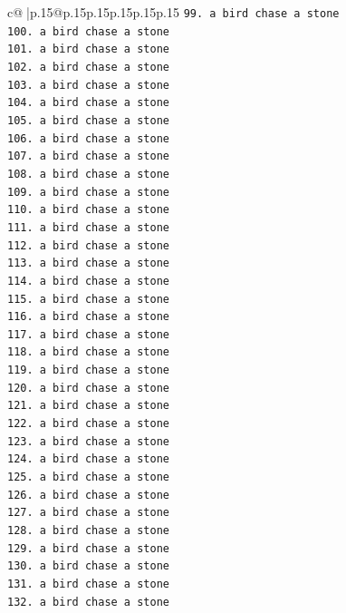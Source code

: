 \documentclass{article}
\begin{document}
{\begin{supertabular}{c@{$\;$}|p{.15\linewidth}@{}p{.15\linewidth}p{.15\linewidth}p{.15\linewidth}p{.15\linewidth}p{.15\linewidth}}
{{{\texttt{99. a bird chase a stone} \\
\texttt{100. a bird chase a stone} \\
\texttt{101. a bird chase a stone} \\
\texttt{102. a bird chase a stone} \\
\texttt{103. a bird chase a stone} \\
\texttt{104. a bird chase a stone} \\
\texttt{105. a bird chase a stone} \\
\texttt{106. a bird chase a stone} \\
\texttt{107. a bird chase a stone} \\
\texttt{108. a bird chase a stone} \\
\texttt{109. a bird chase a stone} \\
\texttt{110. a bird chase a stone} \\
\texttt{111. a bird chase a stone} \\
\texttt{112. a bird chase a stone} \\
\texttt{113. a bird chase a stone} \\
\texttt{114. a bird chase a stone} \\
\texttt{115. a bird chase a stone} \\
\texttt{116. a bird chase a stone} \\
\texttt{117. a bird chase a stone} \\
\texttt{118. a bird chase a stone} \\
\texttt{119. a bird chase a stone} \\
\texttt{120. a bird chase a stone} \\
\texttt{121. a bird chase a stone} \\
\texttt{122. a bird chase a stone} \\
\texttt{123. a bird chase a stone} \\
\texttt{124. a bird chase a stone} \\
\texttt{125. a bird chase a stone} \\
\texttt{126. a bird chase a stone} \\
\texttt{127. a bird chase a stone} \\
\texttt{128. a bird chase a stone} \\
\texttt{129. a bird chase a stone} \\
\texttt{130. a bird chase a stone} \\
\texttt{131. a bird chase a stone} \\
\texttt{132. a bird chase a stone} \\
}}}
\end{supertabular}}
\end{document}
